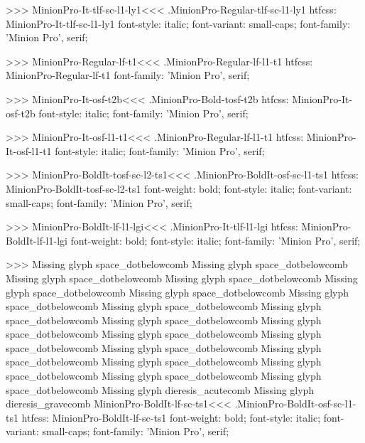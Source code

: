 {>>>
\<MinionPro-It-tlf-sc-l1-ly1\><<<
.MinionPro-Regular-tlf-sc-l1-ly1
htfcss:  MinionPro-It-tlf-sc-l1-ly1  font-style: italic; font-variant: small-caps; font-family: 'Minion Pro', serif;

>>>
\<MinionPro-Regular-lf-t1\><<<
.MinionPro-Regular-lf-l1-t1
htfcss:  MinionPro-Regular-lf-t1  font-family: 'Minion Pro', serif;

>>>
\<MinionPro-It-osf-t2b\><<<
.MinionPro-Bold-tosf-t2b
htfcss:  MinionPro-It-osf-t2b  font-style: italic; font-family: 'Minion Pro', serif;

>>>
\<MinionPro-It-osf-l1-t1\><<<
.MinionPro-Regular-lf-l1-t1
htfcss:  MinionPro-It-osf-l1-t1  font-style: italic; font-family: 'Minion Pro', serif;

>>>
\<MinionPro-BoldIt-tosf-sc-l2-ts1\><<<
.MinionPro-BoldIt-osf-sc-l1-ts1
htfcss:  MinionPro-BoldIt-tosf-sc-l2-ts1  font-weight: bold; font-style: italic; font-variant: small-caps; font-family: 'Minion Pro', serif;

>>>
\<MinionPro-BoldIt-lf-l1-lgi\><<<
.MinionPro-It-tlf-l1-lgi
htfcss:  MinionPro-BoldIt-lf-l1-lgi  font-weight: bold; font-style: italic; font-family: 'Minion Pro', serif;

>>>
Missing glyph	space_dotbelowcomb
Missing glyph	space_dotbelowcomb
Missing glyph	space_dotbelowcomb
Missing glyph	space_dotbelowcomb
Missing glyph	space_dotbelowcomb
Missing glyph	space_dotbelowcomb
Missing glyph	space_dotbelowcomb
Missing glyph	space_dotbelowcomb
Missing glyph	space_dotbelowcomb
Missing glyph	space_dotbelowcomb
Missing glyph	space_dotbelowcomb
Missing glyph	space_dotbelowcomb
Missing glyph	space_dotbelowcomb
Missing glyph	space_dotbelowcomb
Missing glyph	space_dotbelowcomb
Missing glyph	space_dotbelowcomb
Missing glyph	space_dotbelowcomb
Missing glyph	space_dotbelowcomb
Missing glyph	space_dotbelowcomb
Missing glyph	dieresis_acutecomb
Missing glyph	dieresis_gravecomb
\<MinionPro-BoldIt-lf-sc-ts1\><<<
.MinionPro-BoldIt-osf-sc-l1-ts1
htfcss:  MinionPro-BoldIt-lf-sc-ts1  font-weight: bold; font-style: italic; font-variant: small-caps; font-family: 'Minion Pro', serif;

}
